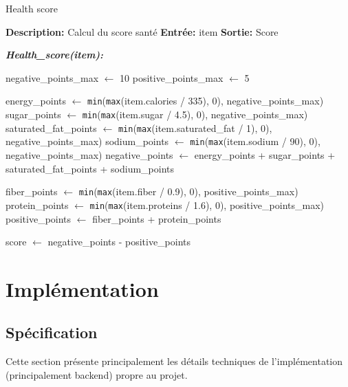 \documentclass[11pt]{article}
\begin{document}
\begin{algorithm}
	\caption{Health score}
	\begin{algorithmic}[1]
		\Statex \textbf{Description:} Calcul du score santé
		\Statex \textbf{Entrée:} item
		\Statex \textbf{Sortie:} Score
		
        \State \textbf{\textit{Health\_score(item):}}

		\State \hspace{0.5cm} negative\_points\_max $\gets$ 10 
		\State \hspace{0.5cm} positive\_points\_max $\gets$ 5

		\State \hspace{0.5cm} energy\_points $\gets$ \texttt{min}(\texttt{max}(item.calories / 335), 0), negative\_points\_max)
		\State \hspace{0.5cm} sugar\_points $\gets$ \texttt{min}(\texttt{max}(item.sugar / 4.5), 0), negative\_points\_max)
		\State \hspace{0.5cm} saturated\_fat\_points $\gets$ \texttt{min}(\texttt{max}(item.saturated\_fat / 1), 0), negative\_points\_max) 
		\State \hspace{0.5cm} sodium\_points $\gets$ \texttt{min}(\texttt{max}(item.sodium / 90), 0), negative\_points\_max)
		\State \hspace{0.5cm} negative\_points $\gets$ energy\_points + sugar\_points + saturated\_fat\_points + sodium\_points

		\State \hspace{0.5cm} fiber\_points $\gets$ \texttt{min}(\texttt{max}(item.fiber / 0.9), 0), positive\_points\_max)
		\State \hspace{0.5cm} protein\_points $\gets$ \texttt{min}(\texttt{max}(item.proteins / 1.6), 0), positive\_points\_max)
		\State \hspace{0.5cm} positive\_points $\gets$ fiber\_points + protein\_points

		\State \hspace{0.5cm} score $\gets$ negative\_points - positive\_points

		\State \hspace{0.5cm} 
	\end{algorithmic}
\end{algorithm}


\newpage
\section{Implémentation}
\label{implementation}
\subsection{Spécification}
Cette section présente principalement les détails techniques de l'implémentation (principalement backend) propre au projet.
\end{document}
